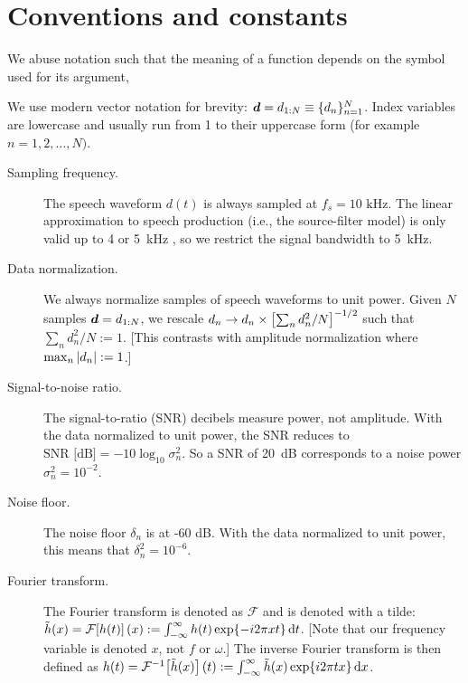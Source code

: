 \chapter{Conventions and constants\label{chapter:conventions}}

We abuse notation such that the meaning of a function depends on the symbol used for its argument, 

We use modern vector notation for brevity: ${\bm d} = d_{1:N} \equiv \{d_n\}_{n=1}^N$.
Index variables are lowercase and usually run from 1 to their uppercase form (for example $n = 1,2,\ldots,N)$.

\begin{description}
\item[Sampling frequency.]
The speech waveform $d(t)$ is always sampled at $f_s = \text{10 kHz}$.
The linear approximation to speech production (i.e., the source-filter model) is only valid up to 4 or 5~kHz \citep{Doval2006,Stevens2000}, so we restrict the signal bandwidth to 5~kHz.

\item[Data normalization.]
We always normalize samples of speech waveforms to unit power.
Given $N$ samples ${\bm d} = d_{1:N}$, we rescale $d_n \rightarrow d_n \times \qty[\sum_n d_n^2/N]^{-1/2}$ such that $\sum_n d_n^2/N := 1$.
[This contrasts with amplitude normalization where $\max_n \abs{d_n} := 1$.]

\item[Signal-to-noise ratio.]
The signal-to-ratio (SNR) decibels measure power, not amplitude.
With the data normalized to unit power, the SNR reduces to $\text{SNR [dB]} = -10 \log_{10} \sigma_n^2$.
So a SNR of 20~dB corresponds to a noise power $\sigma_n^2 = 10^{-2}$.

\item[Noise floor.]
The noise floor $\delta_n$ is at -60 dB.
With the data normalized to unit power, this means that $\delta_n^2 = 10^{-6}$.

\item[Fourier transform.]
The Fourier transform is denoted as $\mathcal{F}$ and is denoted with a tilde: $\tilde{h}(x) = \mathcal{F}\qty[h(t)](x) := \int_{-\infty}^\infty h(t) \exp{-i2\pi xt} \dd{t}$.
[Note that our frequency variable is denoted $x$, not $f$ or $\omega$.]
The inverse Fourier transform is then defined as $h(t) = \mathcal{F}^{-1}\qty[\tilde{h}(x)](t) := \int_{-\infty}^\infty \tilde{h}(x) \exp{i2\pi tx} \dd{x}$.


\end{description}
